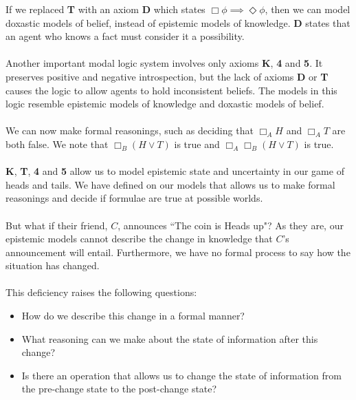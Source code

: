 If we replaced {\bf T} with an axiom {\bf D} which states $\Box \phi
\implies \Diamond \phi$, then we can model doxastic models of belief, instead of
epistemic models of knowledge.
{\bf D} states that an agent who knows a fact must consider it a possibility.\\
\\
Another important modal logic system involves only axioms {\bf K}, {\bf 4} and
{\bf 5}.
It preserves positive and negative introspection, but the lack of axioms {\bf D} or
{\bf T} causes the logic to allow agents to hold inconsistent beliefs.
The models in this logic resemble epistemic models of knowledge and doxastic
models of belief.\\
\\
We can now make formal reasonings, such as deciding that $\Box_A H$ and $\Box_A
T$ are both false.
We note that $\Box_B (H \lor T)$ is true and $\Box_A \Box_B (H \lor T)$ is
true.\\
\\
{\bf K}, {\bf T}, {\bf 4} and {\bf 5} allow us to model epistemic state and
uncertainty in our game of heads and tails.
We have defined on our models that allows us to make formal reasonings and
decide if formulae are true at possible worlds.\\
\\
But what if their friend, $C$, announces ``The coin is Heads up"?
As they are, our epistemic models cannot describe the change in knowledge that
$C$'s announcement will entail.
Furthermore, we have no formal process to say how the situation has changed.\\
\\
This deficiency raises the following questions:
\begin{itemize}
	\item How do we describe this change in a formal manner?
	\item What reasoning can we make about the state of information after this
	change?
	\item Is there an operation that allows us to change the state of information
	from the pre-change state to the post-change state?
\end{itemize}

